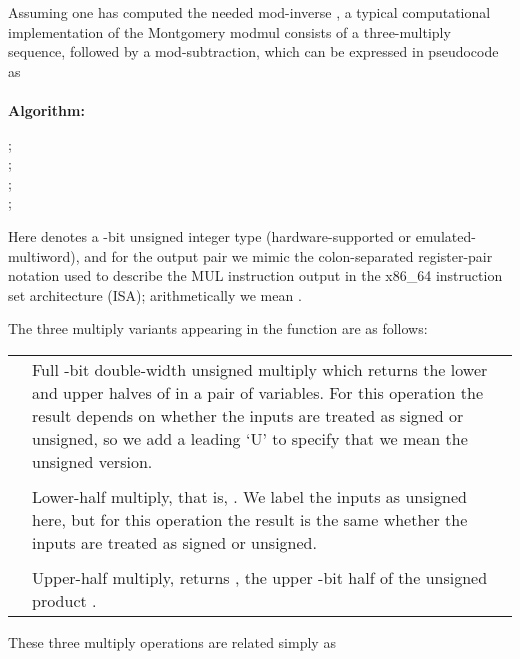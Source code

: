 \documentclass{article}
\begin{document}
Assuming one has computed the needed mod-inverse , a typical computational implementation of the Montgomery modmul consists of a three-multiply sequence, followed by a mod-subtraction, which can be expressed in pseudocode as\\
\\
{\bf Algorithm:} \\
\IncMargin{5em} \begin{algorithm}[H]
\SetAlgoLined
{}
\vspace{0.1in}
{
	;\\
	;\\
	;\\
	;\\
	\eIf {} {
		\Return \;
	}{
		\Return \;
	}
}
\label{MM}
\end{algorithm}
\vspace{0.1in}
Here  denotes a -bit unsigned integer type (hardware-supported or emulated-multiword), and for the  output pair we mimic the colon-separated register-pair notation used to describe the MUL instruction output in the x86\_64 instruction set architecture (ISA); arithmetically we mean .

\vspace{0.1in}
\noindent The three multiply variants appearing in the function are as follows:
\begin{table}[ht]
\begin{center}
\begin{tabular}{l p{3in}}
	&	Full -bit double-width unsigned multiply which returns the lower and upper halves of  in a pair of variables. For this operation the result depends on whether the inputs are treated as signed or unsigned, so we add a leading `U' to specify that we mean the unsigned version.\\
\\
&	Lower-half multiply, that is, . We label the inputs as unsigned here, but for this operation the result is the same whether the inputs are treated as signed or unsigned.\\
\\
&	Upper-half multiply, returns , the upper -bit half of the unsigned product .
\end{tabular}
\end{center}
\end{table}
\setcounter{table}{0}

\noindent These three multiply operations are related simply as
\end{document}
